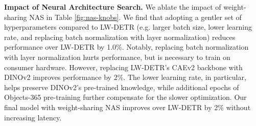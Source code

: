 \documentclass{article} %
\newcommand{\method}{RF-DETR}
\begin{document}
{\begin{table}[t]
{\begin{tabular}{|lcccccccccc|}
\end{tabular}
}
\end{table}
}


\textbf{Impact of Neural Architecture Search.} We ablate the impact of weight-sharing NAS in Table \ref{fig:nas-knobs}. We find that adopting a gentler set of hyperparameters compared to LW-DETR (e.g. larger batch size, lower learning rate, and replacing batch normalization with layer normalization) reduces performance over LW-DETR by 1.0\%. Notably, replacing batch normalization with layer normalization hurts performance, but is necessary to train on consumer hardware. However, replacing LW-DETR's CAEv2 backbone with DINOv2 improves performance by 2\%. The lower learning rate, in particular, helps preserve DINOv2's pre-trained knowledge, while additional epochs of Objects-365 pre-training further compensate for the slower optimization. Our final model with weight-sharing NAS improves over LW-DETR by 2\% without increasing latency.
\end{document}
